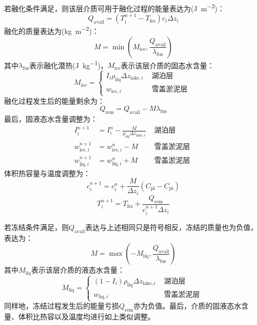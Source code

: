 若融化条件满足，则该层介质可用于融化过程的能量表达为(\unit{J.m^{-2}})：
\begin{equation}
  Q_{\mathrm{avail}}=\left(T_{i}^{n+1}-T_{\mathrm {frz}}\right) c_{i} \Delta z_{i}
\end{equation}
融化的质量表达为(\unit{kg.m^{-2}})：
\begin{equation}
  M=\min \left(M_{\mathrm{ice}}, \frac{Q_{\mathrm{a v a i l}}}{\lambda_{\mathrm {fus}}}\right)
\end{equation}
其中$\lambda_{\mathrm {fus}} $表示融化潜热(\unit{J.kg^{-1}})，$M_{\mathrm{ice}}$表示该层介质的固态水含量：
\begin{equation}
  M_{\mathrm{ice}}=\left\{\begin{array}{lr}I_{i} \rho_{\mathrm{liq}} \Delta z_{\mathrm{lake},i} &
  \text { 湖泊层 } \\ w_{\mathrm{ice},i} & \text { 雪盖淤泥层 }\end{array}\right.
\end{equation}
融化过程发生后的能量剩余为：
\begin{equation}
  Q_{\mathrm{rem}}=Q_{\mathrm{avail}}-M \lambda_{\mathrm {fus}}
\end{equation}
最后，固液态水含量调整为：
\begin{equation}
  \begin{aligned}
    I_{i}^{n+1} &=I_{i}^{n}-\frac{M}{\rho_{\mathrm{liq}} \Delta z_{\mathrm{lake},i}} & \text { 湖泊层 } \\
    w_{\mathrm{ice},i}^{n+1} &=w_{\mathrm{ice},i}^{n}-M & \text { 雪盖淤泥层 } \\
    w_{\mathrm{liq},i}^{n+1} &=w_{\mathrm{liq},i}^{n}+M & \text { 雪盖淤泥层 }
  \end{aligned}
\end{equation}
体积热容量与温度调整为：
\begin{equation}
  c_{i}^{n+1}=c_{i}^{n}+\frac{M}{\Delta z_{i}}\left(C_{\mathrm{p l}}-C_{\mathrm{p i}}\right)
\end{equation}
\begin{equation}
  T_{i}^{n+1}=T_{\mathrm {frz}}+\frac{Q_{\mathrm{rem}}}{c_{i}^{n+1} \Delta z_{i}}
\end{equation}

若冻结条件满足，则$Q_{\mathrm{avail}}$表达与上述相同只是符号相反，冻结的质量也为负值，表达为：
\begin{equation}
  M=\max \left(-M_{\mathrm{liq}}, \frac{Q_{\mathrm{avail}}}{\lambda_{\mathrm {fus}}}\right)
\end{equation}
其中$M_{\mathrm{liq}}$表示该层介质的液态水含量：
\begin{equation}
  M_{\mathrm{liq}}=\left\{\begin{array}{cc}\left(1-I_{i}\right) \rho_{\mathrm{liq}} \Delta z_{\mathrm{lake},i} & \text { 湖泊层 } \\
  w_{\mathrm{liq},i} & \text { 雪盖淤泥层 }\end{array}\right.
\end{equation}
同样地，冻结过程发生后的能量亏损$Q_{\mathrm{rem}}$亦为负值。最后，介质的固液态水含量、体积比热容以及温度均进行如上类似调整。


